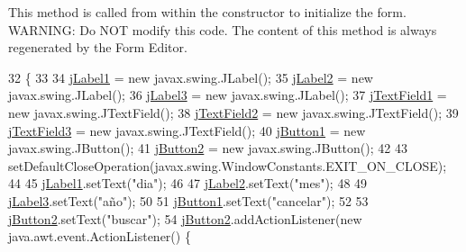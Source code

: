 This method is called from within the constructor to initialize the form. W\+A\+R\+N\+I\+NG\+: Do N\+OT modify this code. The content of this method is always regenerated by the Form Editor. 
\begin{DoxyCode}
32                                   \{
33 
34         \mbox{\hyperlink{class_interfaz_package_1_1_busqueda_facturas_a3cb5b1df90ba3c664ab24c9ddc288a2e}{jLabel1}} = \textcolor{keyword}{new} javax.swing.JLabel();
35         \mbox{\hyperlink{class_interfaz_package_1_1_busqueda_facturas_ad742b0bf64188b05a8296fd972b67b47}{jLabel2}} = \textcolor{keyword}{new} javax.swing.JLabel();
36         \mbox{\hyperlink{class_interfaz_package_1_1_busqueda_facturas_a92d227beb642242b3952cdd159970c32}{jLabel3}} = \textcolor{keyword}{new} javax.swing.JLabel();
37         \mbox{\hyperlink{class_interfaz_package_1_1_busqueda_facturas_ac7cfc9bbf0501c53bb3014890e92efc2}{jTextField1}} = \textcolor{keyword}{new} javax.swing.JTextField();
38         \mbox{\hyperlink{class_interfaz_package_1_1_busqueda_facturas_a3bc720241bb5aea5badbbc7937d79292}{jTextField2}} = \textcolor{keyword}{new} javax.swing.JTextField();
39         \mbox{\hyperlink{class_interfaz_package_1_1_busqueda_facturas_aadd306dde44841b9ab43c6753b3df0d7}{jTextField3}} = \textcolor{keyword}{new} javax.swing.JTextField();
40         \mbox{\hyperlink{class_interfaz_package_1_1_busqueda_facturas_aef5c93b206e8f2f6983c85a8cdbc95d1}{jButton1}} = \textcolor{keyword}{new} javax.swing.JButton();
41         \mbox{\hyperlink{class_interfaz_package_1_1_busqueda_facturas_a667ec2eeb636b4f1822e8f77376ec3ca}{jButton2}} = \textcolor{keyword}{new} javax.swing.JButton();
42 
43         setDefaultCloseOperation(javax.swing.WindowConstants.EXIT\_ON\_CLOSE);
44 
45         \mbox{\hyperlink{class_interfaz_package_1_1_busqueda_facturas_a3cb5b1df90ba3c664ab24c9ddc288a2e}{jLabel1}}.setText(\textcolor{stringliteral}{"dia"});
46 
47         \mbox{\hyperlink{class_interfaz_package_1_1_busqueda_facturas_ad742b0bf64188b05a8296fd972b67b47}{jLabel2}}.setText(\textcolor{stringliteral}{"mes"});
48 
49         \mbox{\hyperlink{class_interfaz_package_1_1_busqueda_facturas_a92d227beb642242b3952cdd159970c32}{jLabel3}}.setText(\textcolor{stringliteral}{"año"});
50 
51         \mbox{\hyperlink{class_interfaz_package_1_1_busqueda_facturas_aef5c93b206e8f2f6983c85a8cdbc95d1}{jButton1}}.setText(\textcolor{stringliteral}{"cancelar"});
52 
53         \mbox{\hyperlink{class_interfaz_package_1_1_busqueda_facturas_a667ec2eeb636b4f1822e8f77376ec3ca}{jButton2}}.setText(\textcolor{stringliteral}{"buscar"});
54         \mbox{\hyperlink{class_interfaz_package_1_1_busqueda_facturas_a667ec2eeb636b4f1822e8f77376ec3ca}{jButton2}}.addActionListener(\textcolor{keyword}{new} java.awt.event.ActionListener() \{

\end{DoxyCode}
